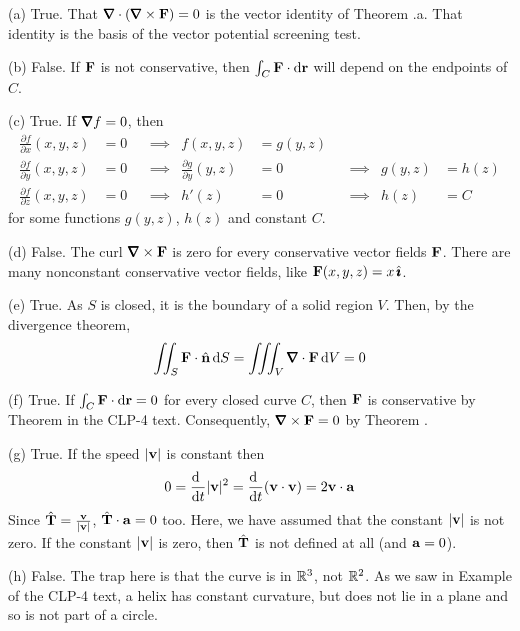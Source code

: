 \begin{solution}
(a) True. That $\vnabla\cdot(\vnabla\times\vF)=0$ is the vector identity of
    Theorem .a. That
    identity is the basis of the vector potential screening test.

(b) False. If $\mathbf{F}$ is not conservative, then $\int_C \mathbf{F}\cdot\mathrm{d}\mathbf{r}$
    will depend on the endpoints of $C$.

(c) True. If $\vnabla f = 0$, then
\begin{align*}
\frac{\partial f}{\partial x}(x,y,z)&=0 &&\implies &
         f(x,y,z)&=g(y,z) \\
\frac{\partial f}{\partial y}(x,y,z)&=0 &&\implies &
                 \frac{\partial g}{\partial y}(y,z)&=0 &&\implies &
         g(y,z)&=h(z) \\
\frac{\partial f}{\partial z}(x,y,z)&=0 &&\implies &
                 h'(z)&=0 &&\implies &
         h(z)&=C 
\end{align*}
for some functions $g(y,z)$, $h(z)$ and constant $C$.

(d) False. The curl $\vnabla\times\vF$ is zero for every conservative
vector fields $\mathbf{F}$. There are many nonconstant conservative vector fields,
like $\mathbf{F}(x,y,z) = x\,\hat{\pmb{\imath}}$.

(e) True. As $S$ is closed, it is the boundary of a solid region $V$.
Then, by the divergence theorem,
\begin{equation*}
\dblInt_S\vF\cdot\hn\, \dee{S}
=\tripInt_V\vnabla\cdot\vF\,\dee{V}
=0
\end{equation*}

(f) True. If $\int_C \mathbf{F}\cdot \mathrm{d}\mathbf{r} = 0$ for every closed curve $C$, 
then $\mathbf{F}$ is conservative by Theorem  
in the CLP-4 text. 
Consequently, $\vnabla \times\vF = 0$ by Theorem .

(g) True. If the speed $|\mathbf{v}|$ is constant then
\begin{align*}
0= \diff{\hfill}{t} |\vv|^2
= \diff{\hfill}{t} (\vv\cdot\vv)
= 2\vv\cdot\va
\end{align*}
Since $\hat{\mathbf{T}}=\frac{\mathbf{v}}{|\mathbf{v}|}$, $\hat{\mathbf{T}}\cdot\mathbf{a}=0$ too.
Here, we have assumed that the constant $|\mathbf{v}|$ is not zero.
If the constant $|\mathbf{v}|$ is zero, then $\hat{\mathbf{T}}$ is not defined at all
(and $\mathbf{a}=0$). 

(h) False. The trap here is that the curve is in $\mathbb{R}^3$, not $\mathbb{R}^2$. 
As we saw in Example  of the CLP-4 text, 
a helix has constant curvature, but does not lie in a plane and so 
is not part of a circle. 


\end{solution}
